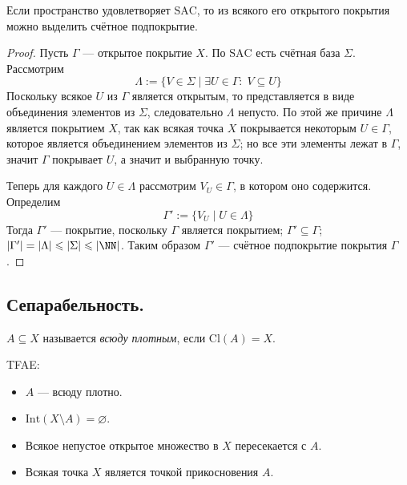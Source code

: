 \documentclass[12pt,a4paper]{article}
\newcommand{\Int}{\ensuremath{\mathrm{Int}}\xspace}
\newcommand{\Cl}{\ensuremath{\mathrm{Cl}}\xspace}
\newcommand{\SAC}{\ensuremath{\mathrm{SAC}}\xspace}
\begin{document}
    \begin{theorem}\label{countable_supcover_by_SAC_theorem}
        Если пространство удовлетворяет \SAC, то из всякого его открытого покрытия можно выделить счётное подпокрытие.
    \end{theorem}

    \begin{proof}
        Пусть $\Gamma$ --- открытое покрытие $X$. По \SAC есть счётная база $\Sigma$. Рассмотрим
        \[\Lambda := \{V \in \Sigma \mid \exists U \in \Gamma:\; V \subseteq U\}\]
        Поскольку всякое $U$ из $\Gamma$ является открытым, то представляется в виде объединения элементов из $\Sigma$, следовательно $\Lambda$ непусто. По этой же причине $\Lambda$ является покрытием $X$, так как всякая точка $X$ покрывается некоторым $U \in \Gamma$, которое является объединением элементов из $\Sigma$; но все эти элементы лежат в $\Gamma$, значит $\Gamma$ покрывает $U$, а значит и выбранную точку.

        Теперь для каждого $U \in \Lambda$ рассмотрим $V_U \in \Gamma$, в котором оно содержится. Определим
        \[\Gamma' := \{V_U \mid U \in \Lambda\}\]
        Тогда $\Gamma'$ --- покрытие, поскольку $\Gamma$ является покрытием; $\Gamma' \subseteq \Gamma$; $|\Gamma'| = |\Lambda| \leqslant |\Sigma| \leqslant |\NN|$. Таким образом $\Gamma'$ --- счётное подпокрытие покрытия $\Gamma$.
    \end{proof}

    \subsection{Сепарабельность.}

    \begin{definition}
        $A \subseteq X$ называется \emph{всюду плотным}, если $\Cl(A) = X$.
    \end{definition}

    \begin{lemma}
        TFAE:
        \begin{multicols}{2}
            \begin{itemize}
                \item $A$ --- всюду плотно.
                \item $\Int(X \setminus A) = \varnothing$.
                \item Всякое непустое открытое множество в $X$ пересекается с $A$.
                \item Всякая точка $X$ является точкой прикосновения $A$.
            \end{itemize}
        \end{multicols}
    \end{lemma}
\end{document}
